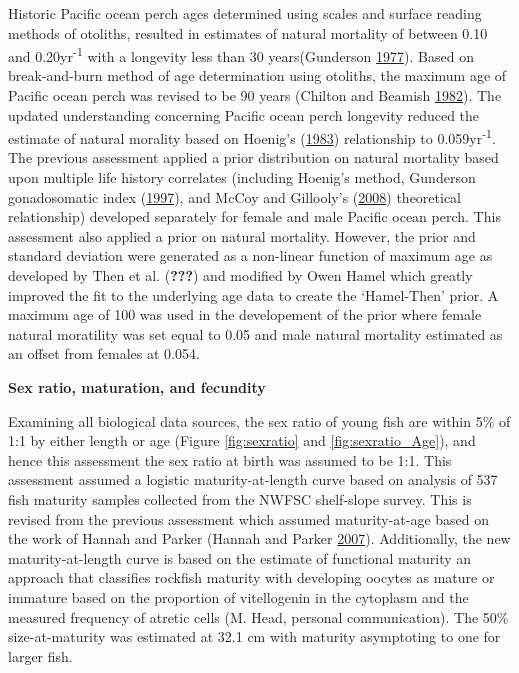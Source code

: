 \documentclass[12pt,]{article}
\begin{document}
Historic Pacific ocean perch ages determined using scales and surface
reading methods of otoliths, resulted in estimates of natural mortality
of between 0.10 and 0.20yr\textsuperscript{-1} with a longevity less
than 30 years(Gunderson
\protect\hyperlink{ref-gunderson_population_1977}{1977}). Based on
break-and-burn method of age determination using otoliths, the maximum
age of Pacific ocean perch was revised to be 90 years (Chilton and
Beamish \protect\hyperlink{ref-chilton_age_1982}{1982}). The updated
understanding concerning Pacific ocean perch longevity reduced the
estimate of natural morality based on Hoenig's
(\protect\hyperlink{ref-hoenig_empirical_1983}{1983}) relationship to
0.059yr\textsuperscript{-1}. The previous assessment applied a prior
distribution on natural mortality based upon multiple life history
correlates (including Hoenig's method, Gunderson gonadosomatic index
(\protect\hyperlink{ref-gunderson_trade-off_1997}{1997}), and McCoy and
Gillooly's (\protect\hyperlink{ref-mccoy_predicting_2008}{2008})
theoretical relationship) developed separately for female and male
Pacific ocean perch. This assessment also applied a prior on natural
mortality. However, the prior and standard deviation were generated as a
non-linear function of maximum age as developed by Then et al.
({\textbf{???}}) and modified by Owen Hamel which greatly improved the
fit to the underlying age data to create the `Hamel-Then' prior. A
maximum age of 100 was used in the developement of the prior where
female natural moratility was set equal to 0.05 and male natural
mortality estimated as an offset from females at 0.054.

\vspace{.5cm}

\textbf{Sex ratio, maturation, and fecundity}

Examining all biological data sources, the sex ratio of young fish are
within 5\% of 1:1 by either length or age (Figure \ref{fig:sexratio} and
\ref{fig:sexratio_Age}), and hence this assessment the sex ratio at
birth was assumed to be 1:1. This assessment assumed a logistic
maturity-at-length curve based on analysis of 537 fish maturity samples
collected from the NWFSC shelf-slope survey. This is revised from the
previous assessment which assumed maturity-at-age based on the work of
Hannah and Parker (Hannah and Parker
\protect\hyperlink{ref-hannah_age-modulated_2007}{2007}). Additionally,
the new maturity-at-length curve is based on the estimate of functional
maturity an approach that classifies rockfish maturity with developing
oocytes as mature or immature based on the proportion of vitellogenin in
the cytoplasm and the measured frequency of atretic cells (M. Head,
personal communication). The 50\% size-at-maturity was estimated at 32.1
cm with maturity asymptoting to one for larger fish.
\end{document}
